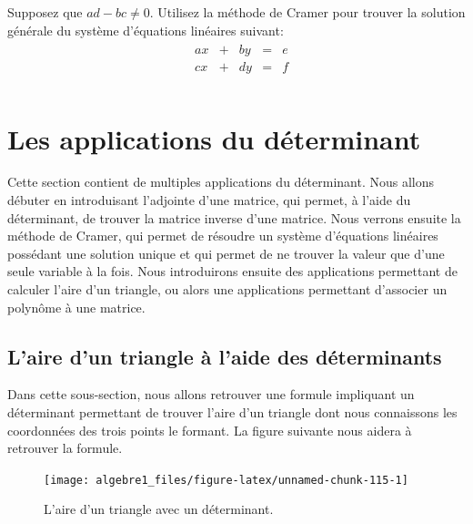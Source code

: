 \documentclass[]{book}
\theoremstyle{definition}
\theoremstyle{definition}
\theoremstyle{definition}
\theoremstyle{remark}
\let\BeginKnitrBlock\begin \let\EndKnitrBlock\end
\begin{document}
\BeginKnitrBlock{example}
\protect\hypertarget{exm:unnamed-chunk-114}{}{\label{exm:unnamed-chunk-114} }Supposez que \(ad-bc\neq 0\). Utilisez la méthode de Cramer pour trouver la solution générale du système d'équations linéaires suivant:
\begin{align*}
\begin{array}{cccccc}
&ax&+&by&=&e\\
&cx&+&dy&=&f\\
\end{array}
\end{align*}
\EndKnitrBlock{example}

\hypertarget{les-applications-du-determinant}{%
\section{Les applications du déterminant}\label{les-applications-du-determinant}}

Cette section contient de multiples applications du déterminant. Nous allons débuter en introduisant l'adjointe d'une matrice, qui permet, à l'aide du déterminant, de trouver la matrice inverse d'une matrice. Nous verrons ensuite la méthode de Cramer, qui permet de résoudre un système d'équations linéaires possédant une solution unique et qui permet de ne trouver la valeur que d'une seule variable à la fois. Nous introduirons ensuite des applications permettant de calculer l'aire d'un triangle, ou alors une applications permettant d'associer un polynôme à une matrice.

\hypertarget{laire-dun-triangle-a-laide-des-determinants}{%
\subsection{L'aire d'un triangle à l'aide des déterminants}\label{laire-dun-triangle-a-laide-des-determinants}}

Dans cette sous-section, nous allons retrouver une formule impliquant un déterminant permettant de trouver l'aire d'un triangle dont nous connaissons les coordonnées des trois points le formant. La figure suivante nous aidera à retrouver la formule.

\begin{figure}

{\centering \texttt{[image: algebre1\_files/figure-latex/unnamed-chunk-115-1]} 

}

\caption{L'aire d'un triangle avec un déterminant.}\label{fig:unnamed-chunk-115}
\end{figure}


\end{document}
